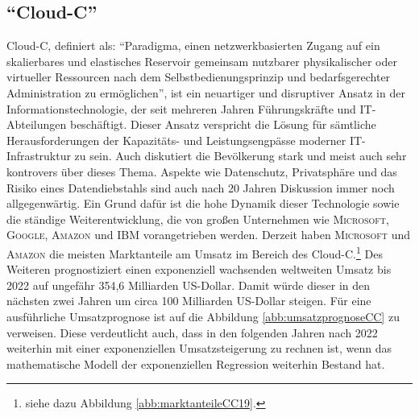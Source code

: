 \subsection{\enquote{\ac{Cloud-C}}}
\ac{Cloud-C}, definiert als: \enquote{Paradigma, einen netzwerkbasierten Zugang auf ein skalierbares und  elastisches Reservoir gemeinsam nutzbarer physikalischer oder virtueller Ressourcen nach dem Selbstbedienungsprinzip und bedarfsgerechter Administration zu ermöglichen}\autocite[][S.\,7]{dindeutsches_institut_fur_normung_informationstechnik_2020-2}, ist ein neuartiger und disruptiver Ansatz in der Informationstechnologie, der seit mehreren Jahren Führungskräfte und IT-Abteilungen beschäftigt. Dieser Ansatz verspricht die Lösung für sämtliche Herausforderungen der Kapazitäts- und Leistungsengpässe moderner IT-Infrastruktur zu sein.\autocite[vgl.][S.\,4]{reinheimer_cloud_2018} Auch diskutiert die Bevölkerung stark und meist auch sehr kontrovers über dieses Thema. Aspekte wie Datenschutz,  Privatsphäre und das Risiko eines Datendiebstahls sind auch nach 20 Jahren Diskussion immer noch allgegenwärtig. Ein Grund dafür ist die hohe Dynamik dieser Technologie sowie die ständige Weiterentwicklung, die von großen Unternehmen wie \textsc{Microsoft}, \textsc{Google}, \textsc{Amazon} und \textsc{IBM} vorangetrieben werden. Derzeit haben \textsc{Microsoft} und \textsc{Amazon} die meisten Marktanteile am Umsatz im Bereich des \ac{Cloud-C}.\footnote{siehe dazu Abbildung \vref{abb:marktanteileCC19}.} Des Weiteren prognostiziert \cite{gartner_cloud_2019} einen exponenziell wachsenden weltweiten Umsatz bis 2022 auf ungefähr 354,6 Milliarden US-Dollar. Damit würde dieser in den nächsten zwei Jahren um circa 100 Milliarden US-Dollar steigen. Für eine ausführliche Umsatzprognose ist auf die Abbildung \vref{abb:umsatzprognoseCC} zu verweisen. Diese verdeutlicht auch, dass in den folgenden Jahren nach 2022 weiterhin mit einer exponenziellen Umsatzsteigerung zu rechnen ist, wenn das mathematische Modell der exponenziellen Regression weiterhin Bestand hat. 
\par
